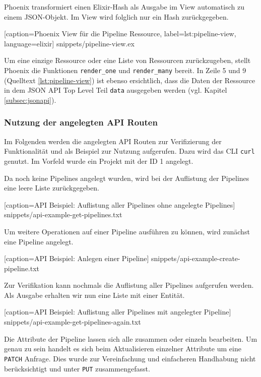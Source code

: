 Phoenix transformiert einen Elixir-Hash als Ausgabe im View automatisch zu einem JSON-Objekt. Im View wird folglich nur ein Hash zurückgegeben.


  [caption={Phoenix View für die Pipeline Ressource},
  label={lst:pipeline-view},
  language=elixir]
  {snippets/pipeline-view.ex}

Um eine einzige Ressource oder eine Liste von Ressourcen zurückzugeben, stellt Phoenix die Funktionen \texttt{render\_one} und \texttt{render\_many} bereit. In Zeile 5 und 9 (Quelltext \ref{lst:pipeline-view}) ist ebenso ersichtlich, dass die Daten der Ressource in dem JSON API Top Level Teil \texttt{data} ausgegeben werden (vgl. Kapitel \ref{subsec:jsonapi}).

\subsubsection{Nutzung der angelegten API Routen}
\label{subsec:api-usage}

Im Folgenden werden die angelegten API Routen zur Verifizierung der Funktionalität und als Beispiel zur Nutzung aufgerufen. Dazu wird das \ac{CLI} \texttt{curl} genutzt. Im Vorfeld wurde ein Projekt mit der ID 1 angelegt.

Da noch keine Pipelines angelegt wurden, wird bei der Auflistung der Pipelines eine leere Liste zurückgegeben.


  [caption={API Beispiel: Auflistung aller Pipelines ohne angelegte Pipelines}]
  {snippets/api-example-get-pipelines.txt}

Um weitere Operationen auf einer Pipeline ausführen zu können, wird zunächst eine Pipeline angelegt.


  [caption={API Beispiel: Anlegen einer Pipeline}]
  {snippets/api-example-create-pipeline.txt}

Zur Verifikation kann nochmals die Auflistung aller Pipelines aufgerufen werden. Als Ausgabe erhalten wir nun eine Liste mit einer Entität.


  [caption={API Beispiel: Auflistung aller Pipelines mit angelegter Pipeline}]
  {snippets/api-example-get-pipelines-again.txt}

Die Attribute der Pipeline lassen sich alle zusammen oder einzeln bearbeiten. Um genau zu sein handelt es sich beim Aktualisieren einzelner Attribute um eine \texttt{PATCH} Anfrage. Dies wurde zur Vereinfachung und einfacheren Handhabung nicht berücksichtigt und unter \texttt{PUT} zusammengefasst.

